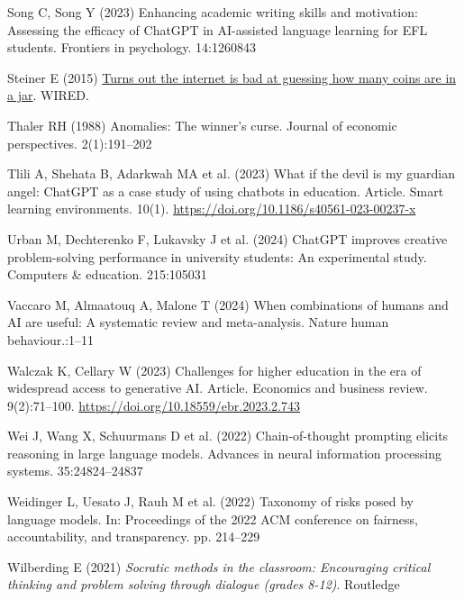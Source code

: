 \documentclass[
  12pt,
]{article}
\newlength{\cslhangindent}
\newenvironment{CSLReferences}[2] %
 {\begin{list}{}{%
  \setlength{\itemindent}{0pt}
  \setlength{\leftmargin}{0pt}
  \setlength{\parsep}{0pt}
  \ifodd #1
   \setlength{\leftmargin}{\cslhangindent}
   \setlength{\itemindent}{-1\cslhangindent}
  \fi
  \setlength{\itemsep}{#2\baselineskip}}}
 {\end{list}}
\begin{document}
\begin{CSLReferences}{1}{0}
Song C, Song Y (2023) Enhancing academic writing skills and motivation: Assessing the efficacy of ChatGPT in AI-assisted language learning for EFL students. Frontiers in psychology. 14:1260843

Steiner E (2015) \href{https://www.wired.com/2015/01/coin-jar-crowd-wisdom-experiment-results/}{Turns out the internet is bad at guessing how many coins are in a jar}. WIRED.

Thaler RH (1988) Anomalies: The winner's curse. Journal of economic perspectives. 2(1):191--202

Tlili A, Shehata B, Adarkwah MA et al. (2023) What if the devil is my guardian angel: ChatGPT as a case study of using chatbots in education. Article. Smart learning environments. 10(1). \url{https://doi.org/10.1186/s40561-023-00237-x}

Urban M, Dechterenko F, Lukavsky J et al. (2024) ChatGPT improves creative problem-solving performance in university students: An experimental study. Computers \& education. 215:105031

Vaccaro M, Almaatouq A, Malone T (2024) When combinations of humans and AI are useful: A systematic review and meta-analysis. Nature human behaviour.:1--11

Walczak K, Cellary W (2023) Challenges for higher education in the era of widespread access to generative AI. Article. Economics and business review. 9(2):71--100. \url{https://doi.org/10.18559/ebr.2023.2.743}

Wei J, Wang X, Schuurmans D et al. (2022) Chain-of-thought prompting elicits reasoning in large language models. Advances in neural information processing systems. 35:24824--24837

Weidinger L, Uesato J, Rauh M et al. (2022) Taxonomy of risks posed by language models. In: Proceedings of the 2022 ACM conference on fairness, accountability, and transparency. pp. 214--229

Wilberding E (2021) \emph{Socratic methods in the classroom: Encouraging critical thinking and problem solving through dialogue (grades 8-12)}. Routledge


\end{CSLReferences}
\end{document}
